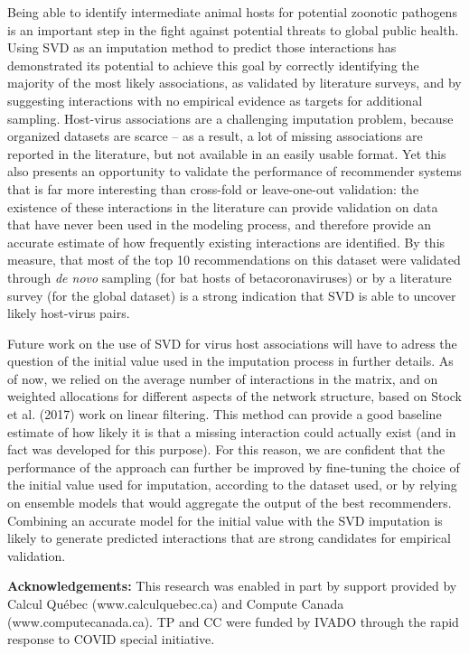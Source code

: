 \documentclass[11pt]{article}
\begin{document}
Being able to identify intermediate animal hosts for potential zoonotic
pathogens is an important step in the fight against potential threats to
global public health. Using SVD as an imputation method to predict those
interactions has demonstrated its potential to achieve this goal by
correctly identifying the majority of the most likely associations, as
validated by literature surveys, and by suggesting interactions with no
empirical evidence as targets for additional sampling. Host-virus
associations are a challenging imputation problem, because organized
datasets are scarce -- as a result, a lot of missing associations are
reported in the literature, but not available in an easily usable
format. Yet this also presents an opportunity to validate the
performance of recommender systems that is far more interesting than
cross-fold or leave-one-out validation: the existence of these
interactions in the literature can provide validation on data that have
never been used in the modeling process, and therefore provide an
accurate estimate of how frequently existing interactions are
identified. By this measure, that most of the top 10 recommendations on
this dataset were validated through \emph{de novo} sampling (for bat
hosts of betacoronaviruses) or by a literature survey (for the global
dataset) is a strong indication that SVD is able to uncover likely
host-virus pairs.

Future work on the use of SVD for virus host associations will have to
adress the question of the initial value used in the imputation process
in further details. As of now, we relied on the average number of
interactions in the matrix, and on weighted allocations for different
aspects of the network structure, based on Stock et al. (2017) work on
linear filtering. This method can provide a good baseline estimate of
how likely it is that a missing interaction could actually exist (and in
fact was developed for this purpose). For this reason, we are confident
that the performance of the approach can further be improved by
fine-tuning the choice of the initial value used for imputation,
according to the dataset used, or by relying on ensemble models that
would aggregate the output of the best recommenders. Combining an
accurate model for the initial value with the SVD imputation is likely
to generate predicted interactions that are strong candidates for
empirical validation.

\textbf{Acknowledgements:} This research was enabled in part by support
provided by Calcul Québec (www.calculquebec.ca) and Compute Canada
(www.computecanada.ca). TP and CC were funded by IVADO through the rapid
response to COVID special initiative.
\end{document}

